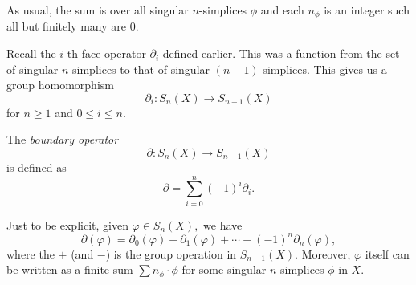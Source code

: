 \documentclass[12pt]{article}
\begin{document}
As usual, the sum is over all singular $n$-simplices $\phi$ and each $n_\phi$ is an integer such all but finitely many are $0.$

Recall the $i$-th face operator $\partial_i$ defined earlier. This was a function from the set of singular $n$-simplices to that of singular $(n-1)$-simplices. This gives us a group homomorphism
\begin{equation*} 
	\partial_i:S_n(X) \to S_{n-1}(X)
\end{equation*}
for $n \ge 1$ and $0 \le i \le n.$

\begin{defn}
	The \emph{boundary operator}
	\begin{equation*} 
		\partial:S_{n}(X) \to S_{n-1}(X)
	\end{equation*}
	is defined as
	\begin{equation*} 
		\partial = \sum_{i=0}^{n}(-1)^i\partial_i.
	\end{equation*}
\end{defn}

Just to be explicit, given $\varphi\in S_n(X),$ we have
\begin{equation*} 
	\partial(\varphi) = \partial_0(\varphi) - \partial_1(\varphi) + \cdots + (-1)^n\partial_n(\varphi),
\end{equation*}
where the $+$ (and $-$) is the group operation in $S_{n-1}(X).$ Moreover, $\varphi$ itself can be written as a finite sum $\sum n_\phi\cdot\phi$ for some singular $n$-simplices $\phi$ in $X.$
\end{document}
